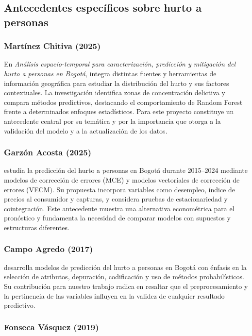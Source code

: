 \documentclass[12pt,letterpaper]{article}
\begin{document}
\subsection{Antecedentes específicos sobre hurto a personas}

\subsubsection{Martínez Chitiva (2025)}

En \emph{Análisis espacio-temporal para caracterización, predicción y mitigación del hurto a personas en Bogotá}, \citet{martinez2025} integra distintas fuentes y herramientas de información geográfica para estudiar la distribución del hurto y sus factores contextuales. La investigación identifica zonas de concentración delictiva y compara métodos predictivos, destacando el comportamiento de Random Forest frente a determinados enfoques estadísticos. Para este proyecto constituye un antecedente central por su temática y por la importancia que otorga a la validación del modelo y a la actualización de los datos.

\subsubsection{Garzón Acosta (2025)}

\citet{garzon2025} estudia la predicción del hurto a personas en Bogotá durante 2015--2024 mediante modelos de corrección de errores (MCE) y modelos vectoriales de corrección de errores (VECM). Su propuesta incorpora variables como desempleo, índice de precios al consumidor y capturas, y considera pruebas de estacionariedad y cointegración. Este antecedente muestra una alternativa econométrica para el pronóstico y fundamenta la necesidad de comparar modelos con supuestos y estructuras diferentes.

\subsubsection{Campo Agredo (2017)}

\citet{campo2017} desarrolla modelos de predicción del hurto a personas en Bogotá con énfasis en la selección de atributos, depuración, codificación y uso de métodos probabilísticos. Su contribución para nuestro trabajo radica en resaltar que el preprocesamiento y la pertinencia de las variables influyen en la validez de cualquier resultado predictivo.

\subsubsection{Fonseca Vásquez (2019)}
\end{document}
